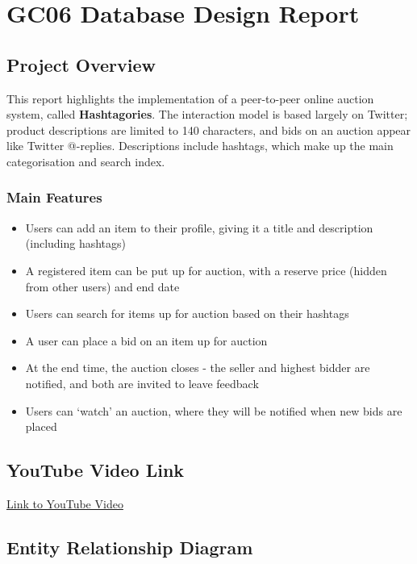 \section{GC06 Database Design Report}\label{gc06-database-design-report}

\subsection{Project Overview}\label{project-overview}

This report highlights the implementation of a peer-to-peer online
auction system, called \textbf{Hashtagories}. The interaction model is
based largely on Twitter; product descriptions are limited to 140
characters, and bids on an auction appear like Twitter @-replies.
Descriptions include hashtags, which make up the main categorisation and
search index.

\subsubsection{Main Features}\label{main-features}

\begin{itemize}
\tightlist
\item
  Users can add an item to their profile, giving it a title and
  description (including hashtags)
\item
  A registered item can be put up for auction, with a reserve price
  (hidden from other users) and end date
\item
  Users can search for items up for auction based on their hashtags
\item
  A user can place a bid on an item up for auction
\item
  At the end time, the auction closes - the seller and highest bidder
  are notified, and both are invited to leave feedback
\item
  Users can `watch' an auction, where they will be notified when new
  bids are placed
\end{itemize}

\subsection{YouTube Video Link}\label{youtube-video-link}

\href{https://www.youtube.com}{Link to YouTube Video}

\subsection{Entity Relationship
Diagram}\label{entity-relationship-diagram}

